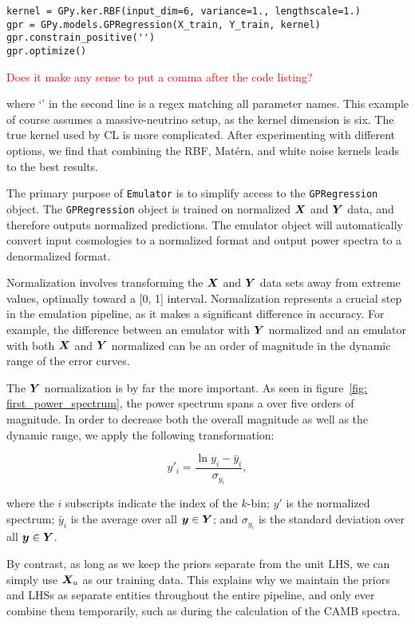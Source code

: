 \begin{verbatim}
kernel = GPy.ker.RBF(input_dim=6, variance=1., lengthscale=1.)
gpr = GPy.models.GPRegression(X_train, Y_train, kernel)
gpr.constrain_positive('')
gpr.optimize()
\end{verbatim}

\textcolor{red}{Does it make any sense to put a comma after the code listing?}

where `' in the second line is a regex matching all parameter names. This
example of course assumes a massive-neutrino setup, as the kernel dimension is
six. The true kernel used by CL is more complicated. After experimenting with
different options, we find that combining the RBF, Mat\'{e}rn, and white noise
kernels leads to the best results.

The primary purpose of \texttt{Emulator} is to simplify access to the
\texttt{GPRegression} object. The \texttt{GPRegression} object is trained on
normalized $\bm{X}$ and $\bm{Y}$ data, and therefore outputs normalized
predictions. The emulator object will automatically convert input cosmologies
to a normalized format and output power spectra to a denormalized format.

Normalization involves transforming the $\bm{X}$ and $\bm{Y}$ data sets
away from extreme values, optimally toward a [0, 1] interval.
Normalization represents a crucial step in the emulation pipeline,
as it makes a significant difference in accuracy. For example, the difference
between an emulator with $\bm{Y}$ normalized and an emulator with
both $\bm{X}$ and $\bm{Y}$ normalized can be an order of magnitude in the
dynamic range of the error curves. 

The $\bm{Y}$ normalization is by far the more important. As seen in
figure~\ref{fig: first_power_spectrum}, the power spectrum spans a over five
orders of magnitude. In order to decrease both the overall magnitude as well
as the dynamic range, we apply the following transformation:

\begin{equation}
\label{eq: y_normalization}
y'_i = \frac{\ln{y_i} - \bar{y}_i}{\sigma_{y_i}}
,\end{equation}

where the $i$ subscripts indicate the index of the $k$-bin; $y'$ is the 
normalized spectrum; $\bar{y}_i$ is the average over all
$\bm{y} \in \bm{Y}$; and $\sigma_{y_i}$ is the 
standard deviation over all $\bm{y} \in \bm{Y}$.

By contrast, as long as we keep the priors separate from the unit LHS, we can
simply use $\bm{X}_u$ as our training data. This explains why we
maintain the priors and LHSs as separate entities throughout the entire
pipeline, and only ever combine them temporarily, such as during the
calculation of the CAMB spectra. 

